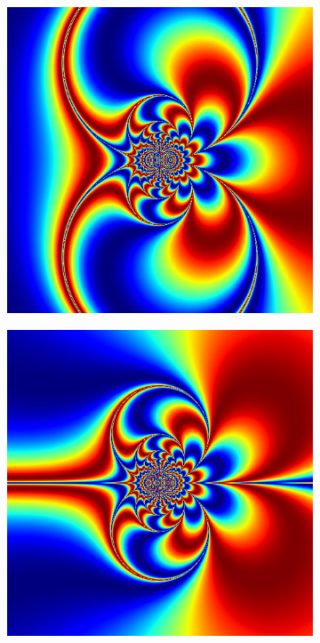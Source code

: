 \begin{figure}
\begin{subfigure}{.32\textwidth}
\includegraphics[width=\textwidth]{exp_inv_real.png}
\end{subfigure}
\begin{subfigure}{.32\textwidth}
\includegraphics[width=\textwidth]{exp_inv_imag.png}

\end{subfigure}
\end{figure}
